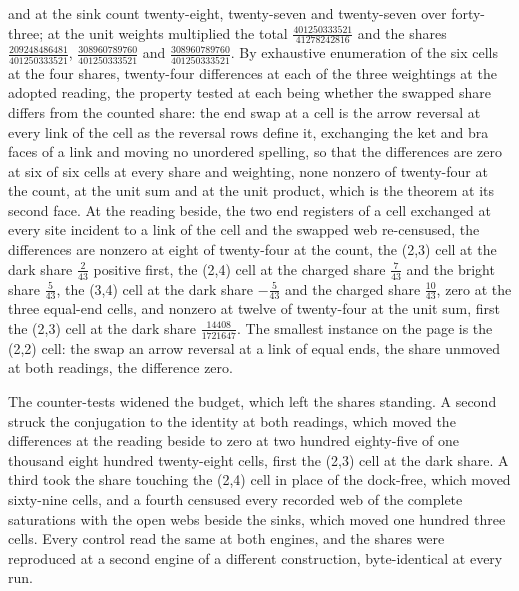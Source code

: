 \begin{chproof}
and at the sink count twenty-eight, twenty-seven and twenty-seven over forty-three; at the unit weights multiplied the total $\tfrac{401250333521}{41278242816}$ and the shares $\tfrac{209248486481}{401250333521}$, $\tfrac{308960789760}{401250333521}$ and $\tfrac{308960789760}{401250333521}$. By exhaustive enumeration of the six cells at the four shares, twenty-four differences at each of the three weightings at the adopted reading, the property tested at each being whether the swapped share differs from the counted share: the end swap at a cell is the arrow reversal at every link of the cell as the reversal rows define it, exchanging the ket and bra faces of a link and moving no unordered spelling, so that the differences are zero at six of six cells at every share and weighting, none nonzero of twenty-four at the count, at the unit sum and at the unit product, which is the theorem at its second face. At the reading beside, the two end registers of a cell exchanged at every site incident to a link of the cell and the swapped web re-censused, the differences are nonzero at eight of twenty-four at the count, the (2,3) cell at the dark share $\tfrac{2}{43}$ positive first, the (2,4) cell at the charged share $\tfrac{7}{43}$ and the bright share $\tfrac{5}{43}$, the (3,4) cell at the dark share $-\tfrac{5}{43}$ and the charged share $\tfrac{10}{43}$, zero at the three equal-end cells, and nonzero at twelve of twenty-four at the unit sum, first the (2,3) cell at the dark share $\tfrac{14408}{1721647}$. The smallest instance on the page is the (2,2) cell: the swap an arrow reversal at a link of equal ends, the share unmoved at both readings, the difference zero.

The counter-tests widened the budget, which left the shares standing. A second struck the conjugation to the identity at both readings, which moved the differences at the reading beside to zero at two hundred eighty-five of one thousand eight hundred twenty-eight cells, first the (2,3) cell at the dark share. A third took the share touching the (2,4) cell in place of the dock-free, which moved sixty-nine cells, and a fourth censused every recorded web of the complete saturations with the open webs beside the sinks, which moved one hundred three cells. Every control read the same at both engines, and the shares were reproduced at a second engine of a different construction, byte-identical at every run.
\end{chproof}
